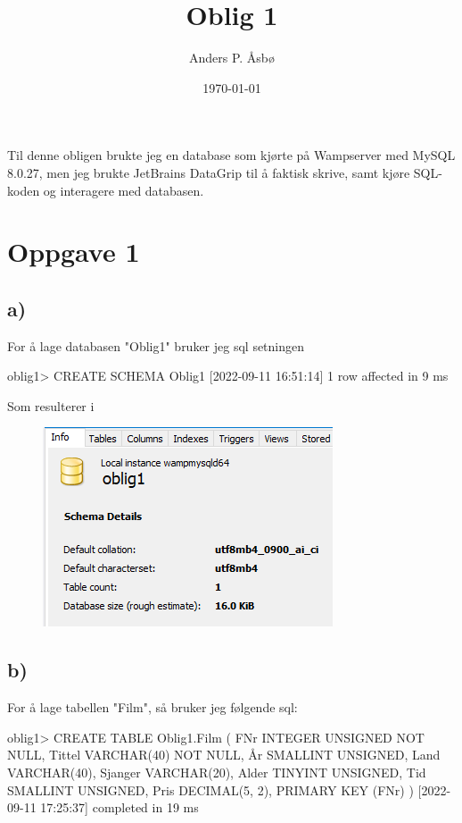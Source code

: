 \documentclass[%
notitlepage,
 amsmath,amssymb,
 aps,
rmp,
]{revtex4-2}  %
\begin{document}
\title{Oblig 1}   %
\author{Anders P. Åsbø}               %
\date{\today}                             %
\noaffiliation                            %

\maketitle                                %

Til denne obligen brukte jeg en database som kjørte på Wampserver med MySQL 8.0.27, men jeg brukte JetBrains DataGrip til å faktisk skrive, samt kjøre SQL-koden og interagere med databasen.

\section*{Oppgave 1}
\subsection*{a)}
For å lage databasen "Oblig1" bruker jeg sql setningen
\begin{sql}
oblig1> CREATE SCHEMA Oblig1
[2022-09-11 16:51:14] 1 row affected in 9 ms
\end{sql}
Som resulterer i
\begin{figure}[H]
\centering\includegraphics[scale=1]{op1a.png}
\end{figure}

\subsection*{b)}
For å lage tabellen "Film", så bruker jeg følgende sql:
\begin{sql}
oblig1> CREATE TABLE Oblig1.Film (
            FNr INTEGER UNSIGNED NOT NULL,
            Tittel VARCHAR(40) NOT NULL,
            År SMALLINT UNSIGNED,
            Land VARCHAR(40),
            Sjanger VARCHAR(20),
            Alder TINYINT UNSIGNED,
            Tid SMALLINT UNSIGNED,
            Pris DECIMAL(5, 2),
            PRIMARY KEY (FNr)
        )
[2022-09-11 17:25:37] completed in 19 ms
\end{sql}
\end{document}

